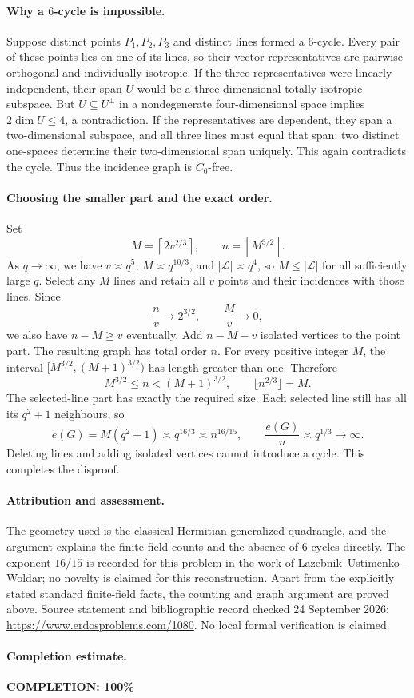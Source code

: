 \paragraph{Why a \(6\)-cycle is impossible.}
Suppose distinct points \(P_1,P_2,P_3\) and distinct lines formed a \(6\)-cycle. Every pair of these points lies on one of its lines, so their vector representatives are pairwise orthogonal and individually isotropic. If the three representatives were linearly independent, their span \(U\) would be a three-dimensional totally isotropic subspace. But \(U\subseteq U^\perp\) in a nondegenerate four-dimensional space implies
\(2\dim U\leq4\), a contradiction. If the representatives are dependent, they span a two-dimensional subspace, and all three lines must equal that span: two distinct one-spaces determine their two-dimensional span uniquely. This again contradicts the cycle. Thus the incidence graph is \(C_6\)-free.

\paragraph{Choosing the smaller part and the exact order.}
Set
\[
 M=\left\lceil2v^{2/3}\right\rceil,\qquad
 n=\left\lceil M^{3/2}\right\rceil.
\]
As \(q\to\infty\), we have \(v\asymp q^5\), \(M\asymp q^{10/3}\), and \(|\mathcal L|\asymp q^4\), so \(M\leq|\mathcal L|\) for all sufficiently large \(q\). Select any \(M\) lines and retain all \(v\) points and their incidences with those lines. Since
\[
 \frac{n}{v}\longrightarrow2^{3/2},\qquad
 \frac{M}{v}\longrightarrow0,
\]
we also have \(n-M\geq v\) eventually. Add \(n-M-v\) isolated vertices to the point part. The resulting graph has total order \(n\).
For every positive integer \(M\), the interval
\([M^{3/2},(M+1)^{3/2})\) has length greater than one. Therefore
\[
 M^{3/2}\leq n<(M+1)^{3/2},
 \qquad \lfloor n^{2/3}\rfloor=M.
\]
The selected-line part has exactly the required size. Each selected line still has all its \(q^2+1\) neighbours, so
\[
 e(G)=M(q^2+1)\asymp q^{16/3}
 \asymp n^{16/15},\qquad
 \frac{e(G)}n\asymp q^{1/3}\longrightarrow\infty.
\]
Deleting lines and adding isolated vertices cannot introduce a cycle. This completes the disproof.

\paragraph{Attribution and assessment.}
The geometry used is the classical Hermitian generalized quadrangle, and the argument explains the finite-field counts and the absence of \(6\)-cycles directly. The exponent \(16/15\) is recorded for this problem in the work of Lazebnik--Ustimenko--Woldar; no novelty is claimed for this reconstruction. Apart from the explicitly stated standard finite-field facts, the counting and graph argument are proved above. Source statement and bibliographic record checked 24 September 2026: \url{https://www.erdosproblems.com/1080}. No local formal verification is claimed.

\paragraph{Completion estimate.}
\textbf{COMPLETION: 100\%}
